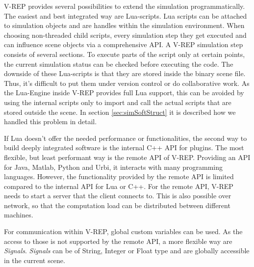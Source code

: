     V-REP provides several possibilities to extend the simulation programmatically. 
    The easiest and best integrated way are Lua-scripts. Lua scripts can be attached to simulation objects and are handles within the simulation environment. 
    When choosing non-threaded child scripts, every simulation step they get executed and can influence scene objects via a comprehensive API. 
    A V-REP simulation step consists of several sections. 
    To execute parts of the script only at certain points, the current simulation status can be checked before executing the code.  
    The downside of these Lua-scripts is that they are stored inside the binary scene file. 
    Thus, it's difficult to put them under version control or do collaborative work. 
    As the Lua-Engine inside V-REP provides full Lua support, this can be avoided by using the internal scripts only to import and call the actual scripts that are stored outside the scene. 
    In section \ref{sec:simSoftStruct} it is described how we handled this problem in detail.
    
    If Lua doesn't offer the needed performance or functionalities, the second way to build deeply integrated software is the internal C++ API for plugins.
    The most flexible, but least performant way is the remote API of V-REP.
    Providing an API for Java, Matlab, Python and Urbi, it interacts with many programming languages.
    However, the functionality provided by the remote API is limited compared to the internal API for Lua or C++.
    For the remote API, V-REP needs to start a server that the client connects to.
    This is also possible over network, so that the computation load can be distributed between different machines.
    
    For communication within V-REP, global custom variables can be used. As the access to those is not supported by the remote API, a more flexible way are \emph{Signals}. \emph{Signals} can be of String, Integer or Float type and are globally accessible  in the current scene. 
    
    


    
    
